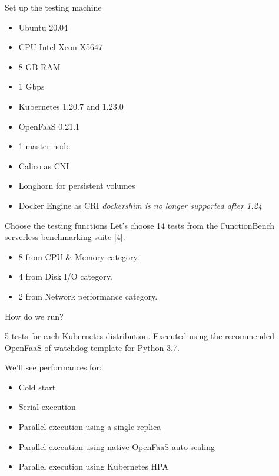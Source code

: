 \begin{frame}{Set up the testing machine}
\begin{itemize}
    \item Ubuntu 20.04
    \item CPU Intel Xeon X5647
    \item 8 GB RAM
    \item 1 Gbps
    \item Kubernetes 1.20.7 and 1.23.0
    \item OpenFaaS 0.21.1
    \item 1 master node
    \item Calico as CNI
    \item Longhorn for persistent volumes
    \item Docker Engine as CRI \pause \textit{\alert{dockershim is no longer supported after 1.24}}
    
\end{itemize}
    
\end{frame}

\begin{frame}{Choose the testing functions}
Let's choose 14 tests from the FunctionBench serverless benchmarking suite [4].

\begin{itemize}
    \item 8 from CPU \& Memory category.
    \item 4 from Disk I/O category.
    \item 2 from Network performance category.
\end{itemize}
    
\end{frame}

\begin{frame}{How do we run?}

5 tests for each Kubernetes distribution. Executed using the recommended OpenFaaS of-watchdog template for Python 3.7.

\pause

We'll see performances for:

\begin{itemize}
    \item Cold start
    \item Serial execution
    \item Parallel execution using a single replica
    \item Parallel execution using native OpenFaaS auto scaling
    \item Parallel execution using Kubernetes HPA
\end{itemize}

\end{frame}

